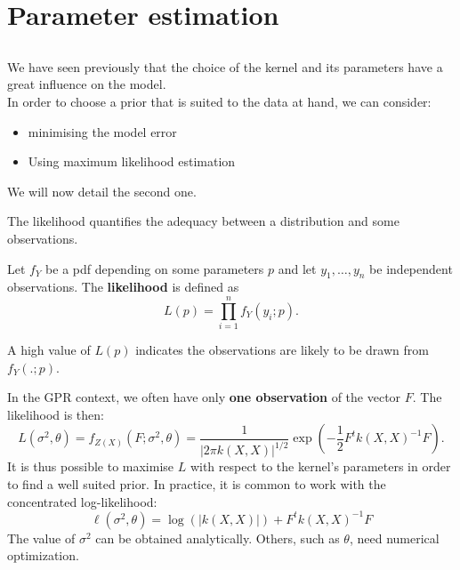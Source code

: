 \documentclass{beamer}
\begin{document}
\section{Parameter estimation}
\subsection{}

\begin{frame}{}
We have seen previously that the choice of the kernel and its parameters have a great influence on the model. \\ \vspace{5mm}
In order to choose a prior that is suited to the data at hand, we can consider:
\begin{itemize}
	\item minimising the model error
	\item Using maximum likelihood estimation 
\end{itemize}
We will now detail the second one.
\end{frame}

\begin{frame}{}
The likelihood quantifies the adequacy between a distribution and some observations. 
\begin{definition}
Let $f_Y$ be a pdf depending on some parameters $p$ and let $y_1,\dots,y_n$ be independent observations. The \textbf{likelihood} is defined as 
\begin{equation*}
 	L(p) = \prod_{i=1}^n f_Y(y_i;p).
\end{equation*} 
\end{definition}
A high value of $L(p)$ indicates the observations are likely to be drawn from $f_Y(.;p)$.
\end{frame}

\begin{frame}{}
In the GPR context, we often have only \textbf{one observation} of the vector $F$. The likelihood is then:
\footnotesize
\begin{equation*}
 	L(\sigma^2,\theta)= f_{Z(X)}(F;\sigma^2,\theta) = \frac{1}{\displaystyle | 2 \pi k(X,X)|^{1/2}} \exp \left(-\frac12 F^t k(X,X)^{-1} F  \right).
\end{equation*} 
\normalsize
It is thus possible to maximise $L$  with respect to the kernel's parameters in order to find a well suited prior. In practice, it is common to work with the concentrated log-likelihood:
\begin{equation*}
 	\ell (\sigma^2, \theta) =  \log(|k(X,X)|) + F^t k(X,X)^{-1} F
\end{equation*} 
The value of $\sigma^2$ can be obtained analytically. Others, such as $\theta$, need numerical optimization.
\end{frame}
\end{document}
